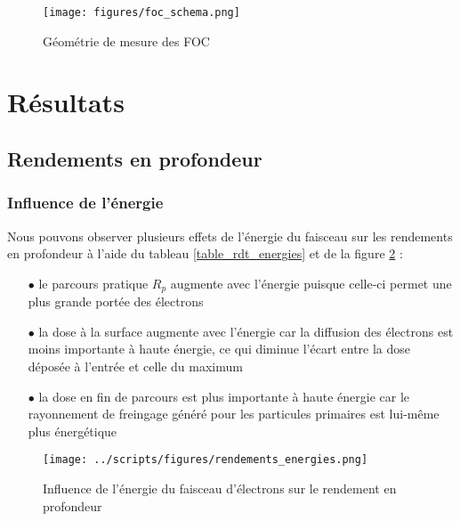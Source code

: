 \documentclass{article}
\begin{document}
\begin{figure}[h]
  \centering
  \texttt{[image: figures/foc\_schema.png]}
  \caption{Géométrie de mesure des FOC \cite{mayles2007handbook}}
  \label{fig_foc}
\end{figure}

\newpage
\section{Résultats}
\subsection{Rendements en profondeur}
\subsubsection{Influence de l'énergie}

Nous pouvons observer plusieurs effets de l'énergie du faisceau sur les rendements en profondeur à l'aide du tableau \ref*{table_rdt_energies} et de la figure \ref*{fig_rdt_energie} :

\begin{itemize}
  \item[$\bullet$] le parcours pratique $R_p$ augmente avec l'énergie puisque celle-ci permet une plus grande portée des électrons
  \item[$\bullet$] la dose à la surface augmente avec l'énergie car la diffusion des électrons est moins importante à haute énergie, ce qui diminue l'écart entre la dose déposée à l'entrée et celle du maximum
  \item[$\bullet$] la dose en fin de parcours est plus importante à haute énergie car le rayonnement de freingage généré pour les particules primaires est lui-même plus énergétique
\end{itemize}

\begin{figure}[h]
  \centering
  \texttt{[image: ../scripts/figures/rendements\_energies.png]}
  \caption{Influence de l'énergie du faisceau d'électrons sur le rendement en profondeur}
  \label{fig_rdt_energie}
\end{figure}
\end{document}
